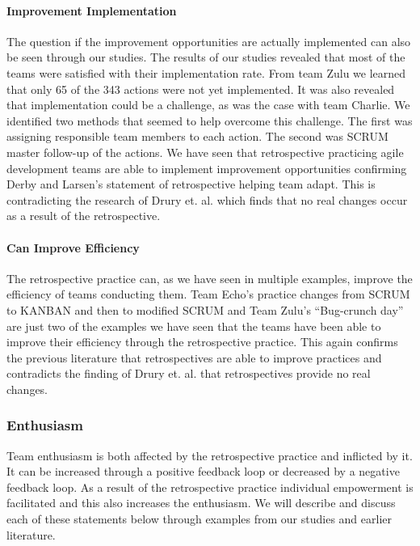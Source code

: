 \paragraph{Improvement Implementation}
The question if the improvement opportunities are actually implemented can also be seen through our studies. The results of our studies revealed that most of the teams were satisfied with their implementation rate. From team Zulu we learned that only 65 of the 343 actions were not yet implemented. It was also revealed that implementation could be a challenge, as was the case with team Charlie. We identified two methods that seemed to help overcome this challenge. The first was assigning responsible team members to each action. The second was SCRUM master follow-up of the actions. We have seen that retrospective practicing agile development teams are able to implement improvement opportunities confirming Derby and Larsen's \cite{Larsen2006} statement of retrospective helping team adapt. This is contradicting the research of Drury et. al. \cite{Drury2012} which finds that no real changes occur as a result of the retrospective. 

\paragraph{Can Improve Efficiency}
The retrospective practice can, as we have seen in multiple examples, improve the efficiency of teams conducting them. Team Echo's practice changes from SCRUM to KANBAN and then to modified SCRUM and Team Zulu's ``Bug-crunch day'' are just two of the examples we have seen that the teams have been able to improve their efficiency through the retrospective practice. This again confirms the previous literature \cite{Dingsoyr2004, Larsen2006, Kinoshita2008} that retrospectives are able to improve practices and contradicts the finding of Drury et. al. \cite{Drury2012} that retrospectives provide no real changes.

\subsubsection{Enthusiasm}
\label{section:positive-loop-enthusiasm}
Team enthusiasm is both affected by the retrospective practice and inflicted by it. It can be increased through a positive feedback loop or decreased by a negative feedback loop. As a result of the retrospective practice individual empowerment is facilitated and this also increases the enthusiasm. We will describe and discuss each of these statements below through examples from our studies and earlier literature. 

